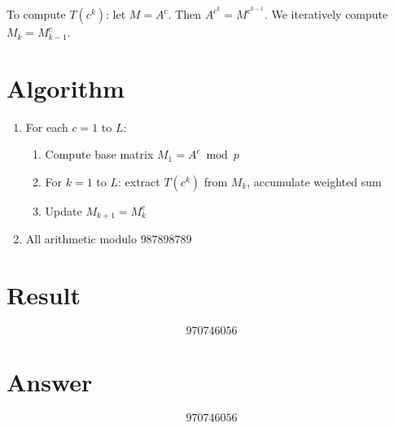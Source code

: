 \documentclass[12pt]{article}
\begin{document}
To compute $T(c^k)$: let $M = A^{c}$. Then $A^{c^k} = M^{c^{k-1}}$. We iteratively compute $M_k = M_{k-1}^c$.

\section{Algorithm}
\begin{enumerate}
    \item For each $c = 1$ to $L$:
    \begin{enumerate}
        \item Compute base matrix $M_1 = A^c \bmod p$
        \item For $k = 1$ to $L$: extract $T(c^k)$ from $M_k$, accumulate weighted sum
        \item Update $M_{k+1} = M_k^c$
    \end{enumerate}
    \item All arithmetic modulo $987898789$
\end{enumerate}

\section{Result}
\[
\boxed{970746056}
\]

\section{Answer}

\[
\boxed{970746056}
\]
\end{document}

